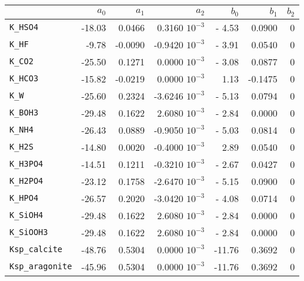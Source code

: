 \documentclass[a4paper]{article}
\begin{document}
\begin{center}
\begin{tabular}{|lrrrrrr|}\hline
              & $a_0$ & $a_1$ & $a_2$ & $b_0$ & $b_1$ & $b_2$\\ \hline
\texttt{K\_HSO4}        & -18.03& 0.0466& 0.3160 $10^{-3}$&- 4.53& 0.0900&0\\
\texttt{K\_HF}          &  -9.78&-0.0090&-0.9420 $10^{-3}$&- 3.91& 0.0540&0\\
\texttt{K\_CO2}         & -25.50& 0.1271& 0.0000 $10^{-3}$&- 3.08& 0.0877&0\\
\texttt{K\_HCO3}        & -15.82&-0.0219& 0.0000 $10^{-3}$&  1.13&-0.1475&0\\
\texttt{K\_W}           & -25.60& 0.2324&-3.6246 $10^{-3}$&- 5.13& 0.0794&0\\
\texttt{K\_BOH3}        & -29.48& 0.1622& 2.6080 $10^{-3}$&- 2.84& 0.0000&0\\
\texttt{K\_NH4}         & -26.43& 0.0889&-0.9050 $10^{-3}$&- 5.03& 0.0814&0\\
\texttt{K\_H2S}         & -14.80& 0.0020&-0.4000 $10^{-3}$&  2.89& 0.0540&0\\
\texttt{K\_H3PO4}       & -14.51& 0.1211&-0.3210 $10^{-3}$&- 2.67& 0.0427&0\\
\texttt{K\_H2PO4}       & -23.12& 0.1758&-2.6470 $10^{-3}$&- 5.15& 0.0900&0\\
\texttt{K\_HPO4}        & -26.57& 0.2020&-3.0420 $10^{-3}$&- 4.08& 0.0714&0\\
\texttt{K\_SiOH4}       & -29.48& 0.1622& 2.6080 $10^{-3}$&- 2.84& 0.0000&0\\ 
\texttt{K\_SiOOH3}      & -29.48& 0.1622& 2.6080 $10^{-3}$&- 2.84& 0.0000&0\\ 
\texttt{Ksp\_calcite}   & -48.76& 0.5304& 0.0000 $10^{-3}$&-11.76& 0.3692&0\\ 
\texttt{Ksp\_aragonite} & -45.96& 0.5304& 0.0000 $10^{-3}$&-11.76& 0.3692&0\\ \hline
\end{tabular}
\end{center}
\end{document}
